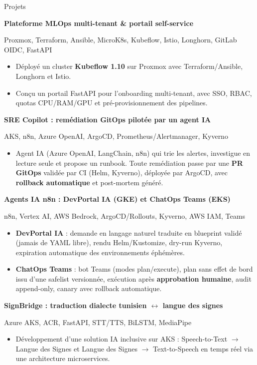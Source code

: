 \documentclass[a4paper]{article}
\newcommand{\SecHead}[1]{{\color{headingc}\fontsize{12.44pt}{15.25pt}\selectfont #1\par}\vspace{4.20pt}}
\newcommand{\jobend}{\vspace{6.00pt}}
\newcommand{\jobrowsolo}[1]{%
  {\fontsize{8.51pt}{12.58pt}\selectfont #1\par}\vspace{3pt}}
\newcommand{\company}[1]{{\color{mutedc}\fontsize{8.19pt}{11.02pt}\selectfont #1\par}\vspace{3.00pt}}
\newenvironment{pubul}[3]{%
  \fontsize{#1}{#2}\selectfont
  \begin{itemize}[leftmargin=#3,labelsep=3pt,label=\textbullet,itemsep=3.00pt,
                  topsep=0pt,parsep=0pt,partopsep=0pt]}%
  {\end{itemize}\vspace{3.00pt}}
\begin{document}
{\begin{minipage}[t]{129.05mm}
\SecHead{Projets}

\jobrowsolo{\textbf{Plateforme MLOps multi-tenant \& portail self-service}}
\company{Proxmox, Terraform, Ansible, MicroK8s, Kubeflow, Istio, Longhorn, GitLab OIDC, FastAPI}
\begin{pubul}{8.19pt}{11.19pt}{9.90pt}
  \item Déployé un cluster \textbf{Kubeflow 1.10} sur Proxmox avec Terraform/Ansible, Longhorn et Istio.
  \item Conçu un portail FastAPI pour l’onboarding multi-tenant, avec SSO, RBAC, quotas CPU/RAM/GPU et pré-provisionnement des pipelines.
\end{pubul}
\jobend

\jobrowsolo{\textbf{SRE Copilot : remédiation GitOps pilotée par un agent IA}}
\company{AKS, n8n, Azure OpenAI, ArgoCD, Prometheus/Alertmanager, Kyverno}
\begin{pubul}{8.19pt}{11.19pt}{9.90pt}
  \item Agent IA (Azure OpenAI, LangChain, n8n) qui trie les alertes, investigue en lecture seule et propose un runbook. Toute remédiation passe par une \textbf{PR GitOps} validée par CI (Helm, Kyverno), déployée par ArgoCD, avec \textbf{rollback automatique} et post-mortem généré.
\end{pubul}
\jobend

\jobrowsolo{\textbf{Agents IA n8n : DevPortal IA (GKE) et ChatOps Teams (EKS)}}
\company{n8n, Vertex AI, AWS Bedrock, ArgoCD/Rollouts, Kyverno, AWS IAM, Teams}
\begin{pubul}{8.19pt}{11.19pt}{9.90pt}
  \item \textbf{DevPortal IA} : demande en langage naturel traduite en blueprint validé (jamais de YAML libre), rendu Helm/Kustomize, dry-run Kyverno, expiration automatique des environnements éphémères.
  \item \textbf{ChatOps Teams} : bot Teams (modes plan/execute), plan sans effet de bord issu d’une safelist versionnée, exécution après \textbf{approbation humaine}, audit append-only, canary avec rollback automatique.
\end{pubul}
\jobend

\jobrowsolo{\textbf{SignBridge : traduction dialecte tunisien $\leftrightarrow$ langue des signes}}
\company{Azure AKS, ACR, FastAPI, STT/TTS, BiLSTM, MediaPipe}
\begin{pubul}{8.19pt}{11.19pt}{9.90pt}
  \item Développement d'une solution IA inclusive sur AKS : Speech-to-Text $\rightarrow$ Langue des Signes et Langue des Signes $\rightarrow$ Text-to-Speech en temps réel via une architecture microservices.
\end{pubul}

\end{minipage}}
\end{document}
